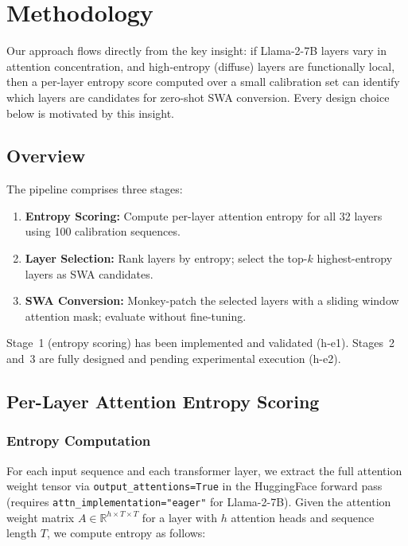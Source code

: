 \section{Methodology}
\label{sec:methodology}

Our approach flows directly from the key insight: if Llama-2-7B layers vary in attention concentration, and high-entropy (diffuse) layers are functionally local, then a per-layer entropy score computed over a small calibration set can identify which layers are candidates for zero-shot SWA conversion. Every design choice below is motivated by this insight.

\subsection{Overview}

The pipeline comprises three stages:

\begin{enumerate}
\item \textbf{Entropy Scoring:} Compute per-layer attention entropy for all 32 layers using 100 calibration sequences.
\item \textbf{Layer Selection:} Rank layers by entropy; select the top-$k$ highest-entropy layers as SWA candidates.
\item \textbf{SWA Conversion:} Monkey-patch the selected layers with a sliding window attention mask; evaluate without fine-tuning.
\end{enumerate}

Stage~1 (entropy scoring) has been implemented and validated (h-e1). Stages~2 and~3 are fully designed and pending experimental execution (h-e2).

\subsection{Per-Layer Attention Entropy Scoring}

\subsubsection{Entropy Computation}

For each input sequence and each transformer layer, we extract the full attention weight tensor via \texttt{output\_attentions=True} in the HuggingFace forward pass (requires \texttt{attn\_implementation="eager"} for Llama-2-7B). Given the attention weight matrix $A \in \mathbb{R}^{h \times T \times T}$ for a layer with $h$ attention heads and sequence length $T$, we compute entropy as follows:

